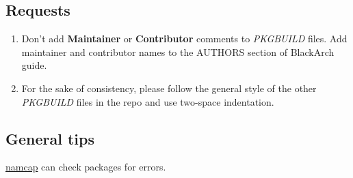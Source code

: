 \documentclass[a4paper, oneside, 11pt]{book}
\begin{document}
\subsection{Requests}
\begin{enumerate}
\item Don't add \textbf{Maintainer} or \textbf{Contributor} comments to
\textit{PKGBUILD} files. Add maintainer and contributor names to the
AUTHORS section of BlackArch guide.
\item For the sake of consistency, please follow the general style of the other
\textit{PKGBUILD} files in the repo and use two-space indentation.
\end{enumerate}

\subsection{General tips}
\href{http://wiki.archlinux.org/index.php/Namcap}{namcap} can check packages for
errors.

\appendix

\end{document}

